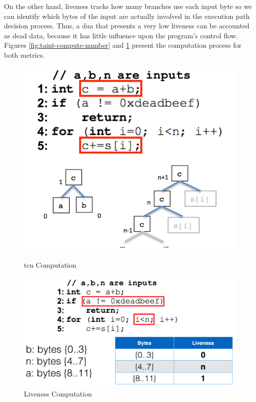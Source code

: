 On the other hand, liveness tracks how many branches use each input byte so we can identify which bytes of the input are actually involved in the execution path decision process. Thus, a \gls{dua} that presents a very low liveness can be accounted as dead data, because it has little influence upon the program's control flow. Figures \ref{fig:taint-compute-number} and \ref{fig:liveness} present the computation process for both metrics.

\begin{figure}[!ht]
    \centering
    \begin{minipage}[t]{7.5cm}
        \centering
        \includegraphics[scale=0.22]{figures/taint-compute-number}
        \caption{\gls{tcn} Computation \cite{dolan2016lava}}
        \label{fig:taint-compute-number}
    \end{minipage}
    \begin{minipage}[t]{8.7cm}
        \centering
        \includegraphics[scale=0.22]{figures/liveness}
        \caption{Liveness Computation \cite{dolan2016lava}}
        \label{fig:liveness}
    \end{minipage}
\end{figure}

